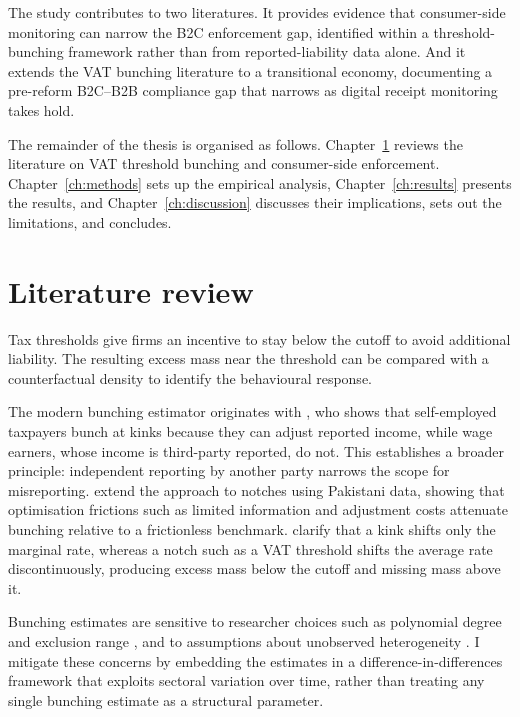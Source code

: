 \documentclass[12pt,oneside,a4paper]{report}
\begin{document}
The study contributes to two literatures. It provides evidence that consumer-side monitoring can narrow the B2C enforcement gap, identified within a threshold-bunching framework rather than from reported-liability data alone. And it extends the VAT bunching literature to a transitional economy, documenting a pre-reform B2C--B2B compliance gap that narrows as digital receipt monitoring takes hold.

The remainder of the thesis is organised as follows. Chapter~\ref{ch:lit_review} reviews the literature on VAT threshold bunching and consumer-side enforcement. Chapter~\ref{ch:methods} sets up the empirical analysis, Chapter~\ref{ch:results} presents the results, and Chapter~\ref{ch:discussion} discusses their implications, sets out the limitations, and concludes.

\chapter{Literature review}
\label{ch:lit_review}

Tax thresholds give firms an incentive to stay below the cutoff to avoid additional liability. The resulting excess mass near the threshold can be compared with a counterfactual density to identify the behavioural response.

The modern bunching estimator originates with \textcite{saez2010taxpayers}, who shows that self-employed taxpayers bunch at kinks because they can adjust reported income, while wage earners, whose income is third-party reported, do not. This establishes a broader principle: independent reporting by another party narrows the scope for misreporting. \textcite{kleven2013using} extend the approach to notches using Pakistani data, showing that optimisation frictions such as limited information and adjustment costs attenuate bunching relative to a frictionless benchmark. \textcite{kleven2016bunching} clarify that a kink shifts only the marginal rate, whereas a notch such as a VAT threshold shifts the average rate discontinuously, producing excess mass below the cutoff and missing mass above it.

Bunching estimates are sensitive to researcher choices such as polynomial degree and exclusion range \parencite{kleven2016bunching}, and to assumptions about unobserved heterogeneity \parencite{blomquist2021bunching, bertanha2023better, anagol2024diffuse}. I mitigate these concerns by embedding the estimates in a difference-in-differences framework that exploits sectoral variation over time, rather than treating any single bunching estimate as a structural parameter.
\end{document}
